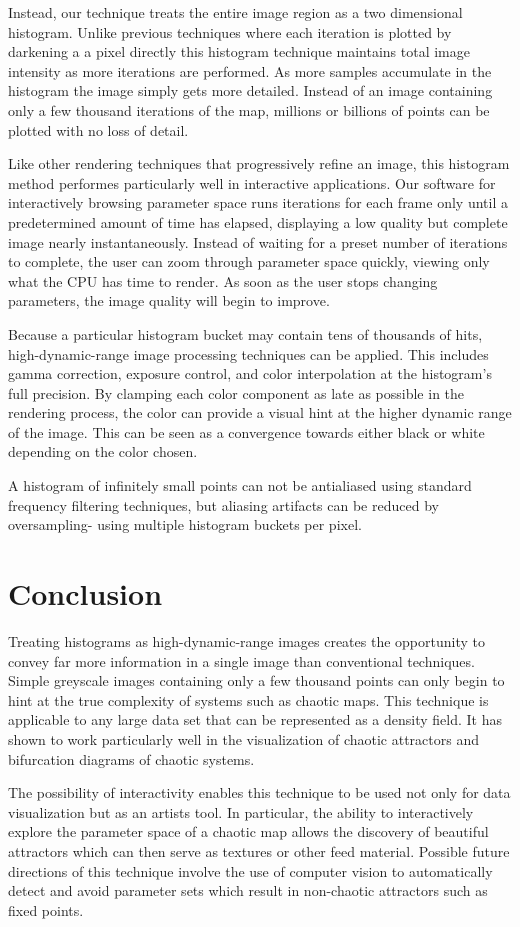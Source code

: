 \documentclass{acmsiggraph}
\begin{document}
Instead, our technique treats the entire image region as a two dimensional
histogram. Unlike previous techniques where each iteration is plotted by
darkening a a pixel directly this histogram technique maintains total image
intensity as more iterations are performed. As more samples accumulate in the
histogram the image simply gets more detailed. Instead of an image containing
only a few thousand iterations of the map, millions or billions of points can
be plotted with no loss of detail.

Like other rendering techniques that progressively refine an image, this
histogram method performes particularly well in interactive applications.
Our software for interactively browsing parameter space runs iterations
for each frame only until a predetermined amount of time has elapsed,
displaying a low quality but complete image nearly instantaneously.
Instead of waiting for a preset number of iterations to complete, the user
can zoom through parameter space quickly, viewing only what the CPU has time
to render. As soon as the user stops changing parameters, the image quality
will begin to improve.

Because a particular histogram bucket may contain tens of thousands of hits,
high-dynamic-range image processing techniques can be applied. This includes
gamma correction, exposure control, and color interpolation at the histogram's
full precision. By clamping each color component as late as possible in the
rendering process, the color can provide a visual hint at the higher
dynamic range of the image. This can be seen as a convergence towards either
black or white depending on the color chosen.

A histogram of infinitely small points can not be antialiased using standard
frequency filtering techniques, but aliasing artifacts can be reduced by
oversampling- using multiple histogram buckets per pixel.

\section{Conclusion}
Treating histograms as high-dynamic-range images creates the opportunity to
convey far more information in a single image than conventional techniques.
Simple greyscale images containing only a few thousand points can only begin
to hint at the true complexity of systems such as chaotic maps. This technique
is applicable to any large data set that can be represented as a density field.
It has shown to work particularly well in the visualization of chaotic
attractors and bifurcation diagrams of chaotic systems.

The possibility of interactivity enables this technique to be used not only
for data visualization but as an artists tool. In particular, the ability
to interactively explore the parameter space of a chaotic map allows the
discovery of beautiful attractors which can then serve as textures or other
feed material. Possible future directions of this technique involve the use
of computer vision to automatically detect and avoid parameter sets which
result in non-chaotic attractors such as fixed points.
\end{document}
